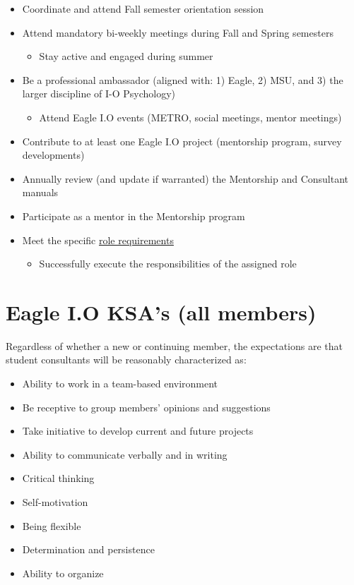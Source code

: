 \documentclass[
]{book}
\providecommand{\tightlist}{%
  \setlength{\itemsep}{0pt}\setlength{\parskip}{0pt}}
\begin{document}
\begin{itemize}
\tightlist
\item
  Coordinate and attend Fall semester orientation session
\item
  Attend mandatory bi-weekly meetings during Fall and Spring semesters

  \begin{itemize}
  \tightlist
  \item
    Stay active and engaged during summer
  \end{itemize}
\item
  Be a professional ambassador (aligned with: 1) Eagle, 2) MSU, and 3) the larger discipline of I-O Psychology)

  \begin{itemize}
  \tightlist
  \item
    Attend Eagle I.O events (METRO, social meetings, mentor meetings)
  \end{itemize}
\item
  Contribute to at least one Eagle I.O project (mentorship program, survey developments)
\item
  Annually review (and update if warranted) the Mentorship and Consultant manuals
\item
  Participate as a mentor in the Mentorship program
\item
  Meet the specific \protect\hyperlink{roles}{role requirements}

  \begin{itemize}
  \tightlist
  \item
    Successfully execute the responsibilities of the assigned role
  \end{itemize}
\end{itemize}

\hypertarget{eagle-i.o-ksas-all-members}{%
\section{Eagle I.O KSA's (all members)}\label{eagle-i.o-ksas-all-members}}

Regardless of whether a new or continuing member, the expectations are that student consultants will be reasonably characterized as:

\begin{itemize}
\tightlist
\item
  Ability to work in a team-based environment
\item
  Be receptive to group members' opinions and suggestions
\item
  Take initiative to develop current and future projects
\item
  Ability to communicate verbally and in writing
\item
  Critical thinking
\item
  Self-motivation
\item
  Being flexible
\item
  Determination and persistence
\item
  Ability to organize
\end{itemize}
\end{document}
